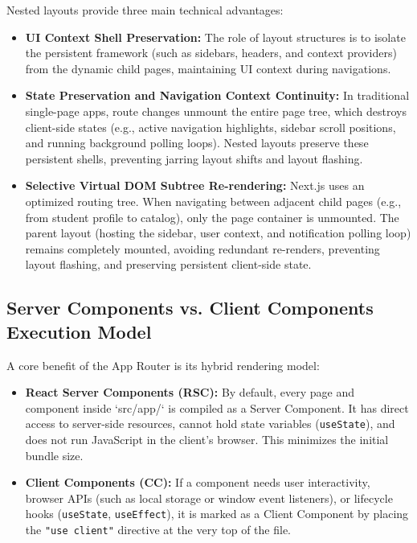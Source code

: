 \documentclass[12pt,a4paper]{article}
\begin{document}
Nested layouts provide three main technical advantages:
\begin{itemize}[leftmargin=2em]
    \item \textbf{UI Context Shell Preservation:} The role of layout structures is to isolate the persistent framework (such as sidebars, headers, and context providers) from the dynamic child pages, maintaining UI context during navigations.
    \item \textbf{State Preservation and Navigation Context Continuity:} In traditional single-page apps, route changes unmount the entire page tree, which destroys client-side states (e.g., active navigation highlights, sidebar scroll positions, and running background polling loops). Nested layouts preserve these persistent shells, preventing jarring layout shifts and layout flashing.
    \item \textbf{Selective Virtual DOM Subtree Re-rendering:} Next.js uses an optimized routing tree. When navigating between adjacent child pages (e.g., from student profile to catalog), only the page container is unmounted. The parent layout (hosting the sidebar, user context, and notification polling loop) remains completely mounted, avoiding redundant re-renders, preventing layout flashing, and preserving persistent client-side state.
\end{itemize}

\subsection{Server Components vs. Client Components Execution Model}

A core benefit of the App Router is its hybrid rendering model:
\begin{itemize}[leftmargin=2em]
    \item \textbf{React Server Components (RSC):} By default, every page and component inside `src/app/` is compiled as a Server Component. It has direct access to server-side resources, cannot hold state variables (\texttt{useState}), and does not run JavaScript in the client's browser. This minimizes the initial bundle size.
    \item \textbf{Client Components (CC):} If a component needs user interactivity, browser APIs (such as local storage or window event listeners), or lifecycle hooks (\texttt{useState}, \texttt{useEffect}), it is marked as a Client Component by placing the \texttt{"use client"} directive at the very top of the file.
\end{itemize}
\end{document}
